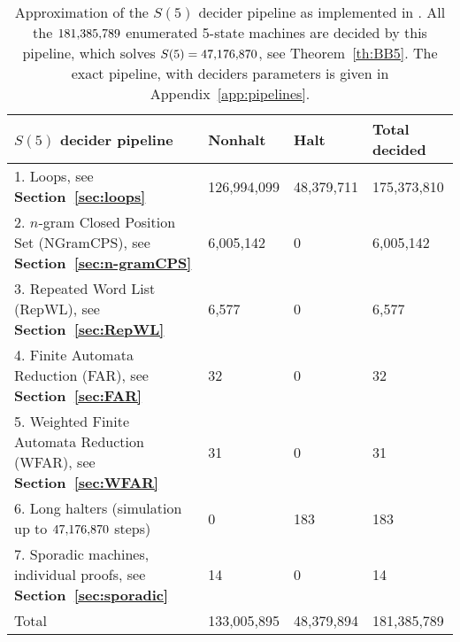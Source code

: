 \begin{table}[h!]

    \begin{tabular}{llll}
        $S(5)$ decider pipeline                                                              & Nonhalt                         & Halt                           & Total decided \\
        \hline
        1. Loops, see \textbf{Section~\ref{sec:loops}}                                       & 126,994,099                     & 48,379,711                     & 175,373,810   \\
        2. $n$-gram Closed Position Set (NGramCPS), see \textbf{Section~\ref{sec:n-gramCPS}} & 6,005,142                       & 0                              & 6,005,142     \\
        3. Repeated Word List (RepWL), see \textbf{Section~\ref{sec:RepWL}}                  & 6,577                           & 0                              & 6,577         \\
        4. Finite Automata Reduction (FAR), see \textbf{Section~\ref{sec:FAR}}               & 32                              & 0                              & 32            \\
        5. Weighted Finite Automata Reduction (WFAR), see \textbf{Section~\ref{sec:WFAR}}    & 31                              & 0                              & 31            \\
        6. Long halters (simulation up to $47{,}176{,}870$ steps)                               & 0                               & 183                            & 183           \\
        7. Sporadic machines, individual proofs, see \textbf{Section~\ref{sec:sporadic}}     & 14                              & 0                              & 14            \\ \hline
        Total                                                                                & \multicolumn{1}{r}{133,005,895} & \multicolumn{1}{r}{48,379,894} & 181,385,789
    \end{tabular}
    \caption{Approximation of the $S(5)$ decider pipeline as implemented in \CoqBB. All the $181{,}385{,}789$ enumerated 5-state machines are decided by this pipeline, which solves $S(5) = 47{,}176{,}870$, see Theorem~\ref{th:BB5}. The exact pipeline, with deciders parameters is given in Appendix~\ref{app:pipelines}. }\label{tab:pipelineBB5}
\end{table}

